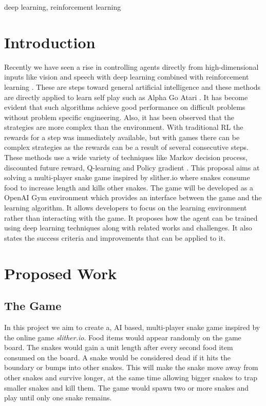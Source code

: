 \documentclass[conference]{IEEEtran}
\begin{document}
\begin{IEEEkeywords}
deep learning, reinforcement learning
\end{IEEEkeywords}

\section{Introduction}
Recently we have seen a rise in controlling agents directly from high-dimensional inputs like vision and speech with deep learning combined with reinforcement learning \cite{sd3} \cite{sd5}. These are steps toward general artificial intelligence and these methods are directly applied to learn self play such as Alpha Go \cite{sd6} Atari \cite{sd3}. It has become evident that such algorithms achieve good performance on difficult problems without problem specific engineering. Also, it has been observed that the strategies are more complex than the environment. With traditional RL the rewards for a step was immediately available, but with games there can be complex strategies as the rewards can be a result of several consecutive steps. These methods use a wide variety of techniques like Markov decision process, discounted future reward, Q-learning \cite{sd5} and Policy gradient \cite{sd4}.\break
This proposal aims at solving a multi-player snake game inspired by slither.io \cite{sd2} where snakes consume food to increase length and kills other snakes. The game will be developed as a OpenAI Gym \cite{sd2} environment which provides an interface between the game and the learning algorithm. It allows developers to focus on the learning environment rather than interacting with the game. It proposes how the agent can be trained using deep learning techniques along with related works and challenges. It also states the success criteria and improvements that can be applied to it. 

\section{Proposed Work}
\subsection*{The Game}
In this project we aim to create a, AI based, multi-player snake game inspired by the online game \textit{slither.io}. Food items would appear randomly on the game board. The snakes would gain a unit length after every second food item consumed on the board. A snake would be considered dead if it hits the boundary or bumps into other snakes. This will make the snake move away from other snakes and survive longer, at the same time allowing bigger snakes to trap smaller snakes and kill them. The game would spawn two or more snakes and play until only one snake remains.\newline\par
\end{document}
